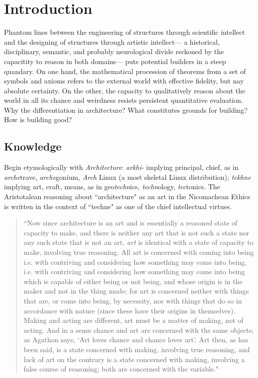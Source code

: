 \section{Introduction}

Phantom lines between the engineering of structures through scientific intellect and the designing of structures through artistic intellect--- a historical, disciplinary, semantic, and probably neurological divide reckoned by the capacitity to reason in both domains--- puts potential builders in a steep quandary. On one hand, the mathematical procession of theorems from a set of symbols and axioms refers to the external world with effective fidelity, but nay absolute certainty. On the other, the capacity to qualitatively reason about the world in all its chance and weirdness resists persistent quantitative evaluation. Why the differentiation in architecture? What constitutes grounds for building? How is building good?

\subsection{Knowledge}
Begin etymologically with \textit{Architecture}: \textit{arkhi-} implying principal, chief, as in \textit{arche}trave, \textit{arche}gonium, \textit{Arch} Linux (a most skeletal Linux distribution); \textit{tekhne} implying art, craft, means, as in geo\textit{techn}ics, \textit{techn}ology, \textit{tec}tonics. The Aristotalean reasoning about ``architecture" as an art in the Nicomachean Ethics is written in the context of ``techne" as one of the chief intellectual virtues.

\begin{quote}
``Now since architecture is an art and is essentially a reasoned state of capacity to make, and there is neither any art that is not such a state nor any such state that is not an art, \textit{art} is identical with a state of capacity to make, involving true reasoning. All art is concerned with coming into being i.e. with contriving and considering how something may come into being, i.e. with contriving and considering how something may come into being which is capable of either being or not being, and whose origin is in the maker and not in the thing made; for art is concerned neither with things that are, or come into being, by necessity, nor with things that do so in accordance with nature (since these have their origins in themselves). Making and acting are different, art must be a matter of making, not of acting. And in a sense chance and art are concerned with the same objects; as Agathon says, `Art loves chance and chance loves art'. Art then, as has been said, is a state concerned with making, involving true reasoning, and lack of art on the contrary is a state concerned with making, involving a false course of reasoning; both are concerned with the variable." \cite[p105]{NICOMACHEANETHICS}
\end{quote}

